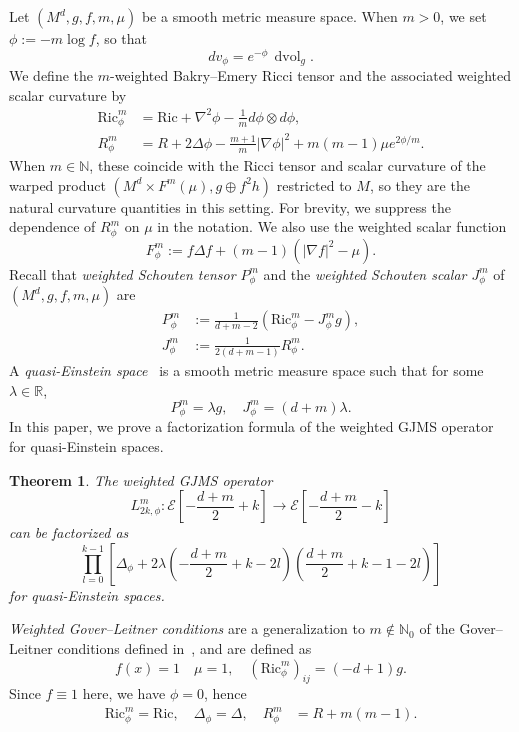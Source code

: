 \documentclass{amsart}
\newcommand{\Ric}{\text{Ric}}
\newtheorem{theorem}{Theorem}[section]
\begin{document}
Let $(M^d,g,f,m,\mu)$ be a smooth metric measure space. When $m>0$, we set $\phi:=-m\log f$, so that
\[ dv_\phi = e^{-\phi}\,\operatorname{dvol}_g . \] {We define the $m$-weighted Bakry--Emery Ricci tensor and the associated weighted scalar curvature by}
\begin{align*}
\Ric_\phi^m &= \Ric + \nabla^2\phi - \frac{1}{m} d\phi \otimes d\phi,\\
R_\phi^m &= R + 2\Delta\phi - \frac{m+1}{m}|\nabla\phi|^2 + m(m-1)\mu e^{2\phi/m} .
\end{align*}
{When $m\in\mathbb{N}$, these coincide with the Ricci tensor and scalar curvature of the warped product $(M^d\times F^m(\mu),g\oplus f^2 h)$ restricted to $M$, so they are the natural curvature quantities in this setting. For brevity, we suppress the dependence of $R_\phi^m$ on $\mu$ in the notation.}
{We also use the weighted scalar function \[F_\phi^m:=f\Delta f+(m-1)(|\nabla f|^2-\mu).\]}
Recall that \emph{weighted Schouten tensor $P_\phi^m$} and the \emph{weighted Schouten scalar $J_\phi^m$} of $(M^d,g,f,m,\mu)$ are
\begin{align*}
    P_\phi^m & := \frac{1}{d+m-2}(\Ric_\phi^m - J_\phi^m g), \\
    J_\phi^m & := \frac{1}{2(d+m-1)}R_\phi^m .
\end{align*}
A \emph{quasi-Einstein space}~\cites{Case2014s} is a smooth metric measure space such that for some $\lambda\in\mathbb{R}$, \[P_\phi^m=\lambda g, \quad J_\phi^m=(d+m)\lambda.\] In this paper, we prove a factorization formula of the weighted GJMS operator for quasi-Einstein spaces.
\begin{theorem}
\label{quasi-einstein-theorem}
The weighted GJMS operator
\begin{equation*}L_{2k,\phi}^m: \mathcal{E}\left[-\frac{d+m}{2}+k\right] \rightarrow \mathcal{E}\left[-\frac{d+m}{2}-k\right]\end{equation*}
can be factorized as
\begin{equation*}
\prod_{l=0}^{k-1}\left[\Delta_\phi+2\lambda\left(-\frac{d+m}{2}+k-2l\right)\left(\frac{d+m}{2}+k-1-2l\right)\right]
\end{equation*}
for quasi-Einstein spaces.
\end{theorem}
\emph{Weighted Gover--Leitner conditions} are a generalization to $m\notin \mathbb{N}_0$ of the Gover--Leitner conditions defined in~\cites{GoverLeitner2009}, and are defined as
\begin{equation*}
f(x)=1\quad
\mu=1,\quad
(\text{Ric}_\phi^m)_{ij}=(-d+1)g.
\end{equation*} {Since $f\equiv 1$ here, we have $\phi=0$, hence 
\begin{align*}
\Ric_\phi^m=\Ric,\quad \Delta_\phi=\Delta,\quad R_\phi^m&=R+m(m-1).
\end{align*}}
\end{document}
